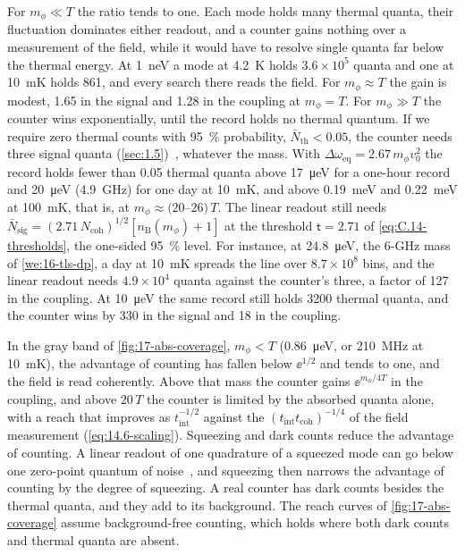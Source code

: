 For $m_\phi \ll T$ the ratio tends to one. Each mode holds many thermal quanta, their fluctuation dominates either readout, and a counter gains nothing over a measurement of the field, while it would have to resolve single quanta far below the thermal energy. At \SI{1}{neV} a mode at \SI{4.2}{K} holds $3.6\times10^5$ quanta and one at \SI{10}{mK} holds 861, and every search there reads the field. For $m_\phi \approx T$ the gain is modest, 1.65 in the signal and 1.28 in the coupling at $m_\phi = T$. For $m_\phi \gg T$ the counter wins exponentially, until the record holds no thermal quantum. If we require zero thermal counts with \SI{95}{\percent} probability, $\bar N_{\mathrm{th}} < 0.05$, the counter needs three signal quanta (\cref{sec:1.5})~\cite[Eqs.~(19), (20)]{lamoreaux2013analysis}, whatever the mass. With $\Delta\omega_{\mathrm{eq}} = 2.67\,m_\phi v_0^2$ the record holds fewer than 0.05 thermal quanta above \SI{17}{\micro eV} for a one-hour record and \SI{20}{\micro eV} (\SI{4.9}{GHz}) for one day at \SI{10}{mK}, and above \SI{0.19}{meV} and \SI{0.22}{meV} at \SI{100}{mK}, that is, at $m_\phi \approx (20$--$26)\,T$. The linear readout still needs $\bar N_{\mathrm{sig}} = (2.71\,N_{\mathrm{coh}})^{1/2}[n_{\mathrm{B}}(m_\phi) + 1]$ at the threshold $\mathsf{t} = 2.71$ of \cref{eq:C.14-thresholds}, the one-sided \SI{95}{\percent} level. For instance, at \SI{24.8}{\micro eV}, the 6-GHz mass of \cref{we:16-tls-dp}, a day at \SI{10}{mK} spreads the line over $8.7\times10^8$ bins, and the linear readout needs $4.9\times10^4$ quanta against the counter's three, a factor of 127 in the coupling. At \SI{10}{\micro eV} the same record still holds 3200 thermal quanta, and the counter wins by 330 in the signal and 18 in the coupling.

In the gray band of \cref{fig:17-abs-coverage}, $m_\phi < T$ (\SI{0.86}{\micro eV}, or \SI{210}{MHz} at \SI{10}{mK}), the advantage of counting has fallen below $\ee^{1/2}$ and tends to one, and the field is read coherently. Above that mass the counter gains $\ee^{m_\phi/4T}$ in the coupling, and above $20\,T$ the counter is limited by the absorbed quanta alone, with a reach that improves as $t_{\mathrm{int}}^{-1/2}$ against the $(t_{\mathrm{int}}t_{\mathrm{coh}})^{-1/4}$ of the field measurement (\cref{eq:14.6-scaling}). Squeezing and dark counts reduce the advantage of counting. A linear readout of one quadrature of a squeezed mode can go below one zero-point quantum of noise~\cite{lamoreaux2013analysis}, and squeezing then narrows the advantage of counting by the degree of squeezing. A real counter has dark counts besides the thermal quanta, and they add to its background. The reach curves of \cref{fig:17-abs-coverage} assume background-free counting, which holds where both dark counts and thermal quanta are absent.
